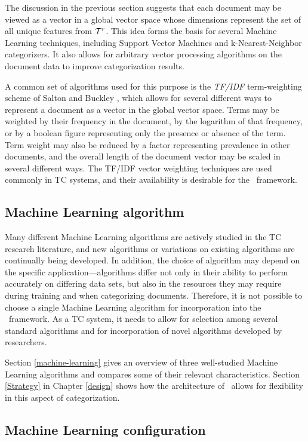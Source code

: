 The discussion in the previous section suggests that each document may
be viewed as a vector in a global vector space whose dimensions
represent the set of all unique features from $\mathcal{T}^r$.  This idea
forms the basis for several Machine Learning techniques, including
Support Vector Machines and k-Nearest-Neighbor categorizers.  It also
allows for arbitrary vector processing algorithms on the document data
to improve categorization results.

A common set of algorithms used for this purpose is the \emph{TF/IDF}
term-weighting scheme of Salton and Buckley \cite{salton:88}, which
allows for several different ways to represent a document as a vector
in the global vector space.  Terms may be weighted by their frequency
in the document, by the logarithm of that frequency, or by a boolean
figure representing only the presence or absence of the term.  Term
weight may also be reduced by a factor representing prevalence in
other documents, and the overall length of the document vector may be
scaled in several different ways.  The TF/IDF vector weighting
techniques are used commonly in TC systems, and their availability is
desirable for the \aicat\ framework.

\subsection{Machine Learning algorithm}

Many different Machine Learning algorithms are actively studied in the
TC research literature, and new algorithms or variations on existing
algorithms are continually being developed.  In addition, the choice
of algorithm may depend on the specific application---algorithms
differ not only in their ability to perform accurately on differing
data sets, but also in the resources they may require during training
and when categorizing documents.  Therefore, it is not possible to
choose a single Machine Learning algorithm for incorporation into the
\aicat\ framework.  As a TC system, it needs to allow for selection
among several standard algorithms and for incorporation of novel
algorithms developed by researchers.

Section \ref{machine-learning} gives an overview of three well-studied
Machine Learning algorithms and compares some of their relevant
characteristics.  Section \ref{Strategy} in Chapter \ref{design} shows
how the architecture of \aicat\ allows for flexibility in this aspect
of categorization.

\subsection{Machine Learning configuration}
\label{ml-config}


